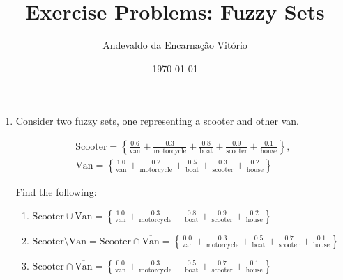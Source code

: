 \documentclass{article}
\title{Exercise Problems: Fuzzy Sets}
\author{Andevaldo da Encarnação Vitório}
\date{\today}
\begin{document}
\maketitle

\begin{enumerate}
  \item Consider two fuzzy sets, one representing a scooter and other van.

        \begin{gather*}
          \mathrm{Scooter} = \left\{
          \frac{0.6}{\mathrm{van}} +
          \frac{0.3}{\mathrm{motor cycle}} +
          \frac{0.8}{\mathrm{boat}} +
          \frac{0.9}{\mathrm{scooter}} +
          \frac{0.1}{\mathrm{house}}
          \right\}, \\[12pt]
          \mathrm{Van} = \left\{
          \frac{1.0}{\mathrm{van}} +
          \frac{0.2}{\mathrm{motor cycle}} +
          \frac{0.5}{\mathrm{boat}} +
          \frac{0.3}{\mathrm{scooter}} +
          \frac{0.2}{\mathrm{house}}
          \right\}
        \end{gather*}

        Find the following:

        \begin{enumerate}
          \item $\mathrm{Scooter} \cup \mathrm{Van} = \boldsymbol{
                    \left\{
                    \frac{1.0}{\mathrm{van}} +
                    \frac{0.3}{\mathrm{motor cycle}} +
                    \frac{0.8}{\mathrm{boat}} +
                    \frac{0.9}{\mathrm{scooter}} +
                    \frac{0.2}{\mathrm{house}}
                    \right\}}$
                \vspace{8pt}

          \item $\mathrm{Scooter} \setminus \mathrm{Van} =
                  \mathrm{Scooter} \cap \overline{\mathrm{Van}} =
                  \boldsymbol{\left\{
                    \frac{0.0}{\mathrm{van}} +
                    \frac{0.3}{\mathrm{motor cycle}} +
                    \frac{0.5}{\mathrm{boat}} +
                    \frac{0.7}{\mathrm{scooter}} +
                    \frac{0.1}{\mathrm{house}}
                    \right\}}$
                \vspace{8pt}

          \item $\mathrm{Scooter} \cap \overline{\mathrm{Van}}  =
                  \boldsymbol{\left\{
                    \frac{0.0}{\mathrm{van}} +
                    \frac{0.3}{\mathrm{motor cycle}} +
                    \frac{0.5}{\mathrm{boat}} +
                    \frac{0.7}{\mathrm{scooter}} +
                    \frac{0.1}{\mathrm{house}}
                    \right\}}$
                \vspace{8pt}


\end{enumerate}
\end{enumerate}
\end{document}
